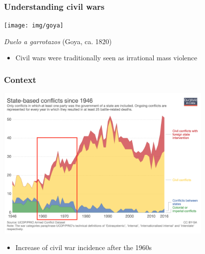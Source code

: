\documentclass[aspectratio=43]{beamer}
\begin{document}
\begin{frame}
\frametitle{Understanding civil wars}
\centering

\texttt{[image: img/goya]}

\textit{Duelo a garrotazos} (Goya, ca. 1820)

\vspace{15pt}

\begin{itemize}
  \item Civil wars were traditionally seen as irrational mass violence
\end{itemize}

\end{frame}

\begin{frame}
\frametitle{Context}
\centering

\includegraphics[width = 0.8\textwidth]{img/conflicts_over_time2}

\begin{itemize}
  \item Increase of civil war incidence after the 1960s
\end{itemize}

\end{frame}
\end{document}
